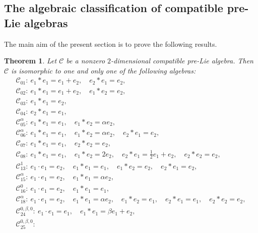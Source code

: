 \documentclass[10pt,a4paper]{amsart}
\numberwithin{equation}{section}
\newtheorem{Theorem}{Theorem}[section]
\begin{document}
\subsection{The algebraic classification of compatible pre-Lie algebras}
The main aim of the present section is to prove the following results.



\begin{Theorem}
\label{compre2} Let $\mathcal{C}$ be a nonzero $2$-dimensional compatible pre-Lie algebra.
Then $\mathcal{C}$ is isomorphic to one {and only one} of the following
algebras:
\begin{gather*}
 \mathcal{C}_{01} \colon\ e_{1} \ast e_{1} = e_{1} + e_{2},\quad e_{2} \ast e_{1} =e_{2},\\
 \mathcal{C}_{02} \colon\ e_{1}\ast e_{1} = e_{1} + e_{2}, \quad e_{1}\ast e_{2} =e_{2}, \\
 \mathcal{C}_{03} \colon\ e_{1}\ast e_{1} =e_{2},\\
 \mathcal{C}_{04} \colon\ e_{2} \ast e_{1} =e_{1}, \\
 \mathcal{C}_{05}^{\alpha} \colon\ e_{1}\ast e_{1} =e_{1},\quad e_{1}\ast e_{2} = \alpha e_{2}, \\
 \mathcal{C}_{06}^{\alpha} \colon\ e_{1} \ast e_{1} =e_{1}, \quad e_{1} \ast e_{2} = \alpha e_{2}, \quad e_{2} \ast e_{1} =e_{2}, \\
 \mathcal{C}_{07} \colon\ e_{1}\ast e_{1} =e_{1},\quad e_{2}\ast e_{2}=e_{2}, \\
 \mathcal{C}_{08} \colon\ e_{1}\ast e_{1} =e_{1}, \quad e_{1}\ast e_{2} = 2 e_{2},\quad e_{2}\ast e_{1} =\tfrac{1}{2} e_{1} + e_2, \quad e_{2}\ast e_{2}=e_{2}, \\
 \mathcal{C}_{13}^{1 }\colon\
e_{1}\cdot e_{1}=e_{2}, \quad
e_{1}\ast e_{1}= e_{1},\quad e_{1}\ast e_{2}=e_{2},\quad e_{2}\ast
e_{1}= e_{2},
\\
 \mathcal{C}_{15}^{\alpha }\colon\
 e_{1}\cdot e_{1}=e_{2}, \quad
 e_{1}\ast e_{1}=\alpha e_{2},
\\
 \mathcal{C}_{16}^{0 }\colon\
 e_{1}\cdot e_{1}=e_{2}, \quad
 e_{1}\ast e_{1}=e_{1},
\\
 \mathcal{C}_{18}^{\alpha }\colon\
 e_{1}\cdot e_{1}=e_{2}, \quad
 e_{1}\ast e_{1}=\alpha e_{2},\quad e_{1}\ast e_{2}=e_{1},\quad e_{2}\ast
e_{1}=e_{1}, \quad e_{2}\ast e_{2}=e_{2},
\\
 \mathcal{C}_{24}^{0 ,\beta ,0 }\colon\
 e_{1}\cdot e_{1}=e_{1}, \quad
 e_{1}\ast e_{1}=\beta e_{1}+e_{2},
\\
 \mathcal{C}_{25}^{0 ,\beta ,0 }\colon\

\end{gather*}
\end{Theorem}
\end{document}

